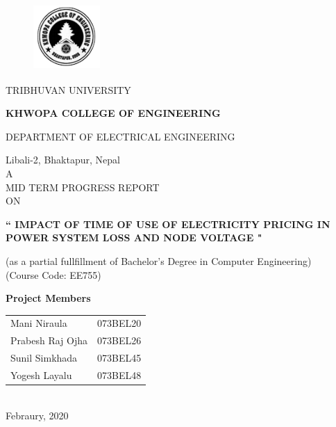\documentclass[12pt]{article}
\begin{document}
\begin{titlepage}
\begin{figure}[H]
\centering
\includegraphics[width=1in,height=1in]{KhwopaLogo.PNG}
\end{figure}

\begin{center}
TRIBHUVAN UNIVERSITY\\
\begin{Large}
\textbf{KHWOPA COLLEGE OF ENGINEERING\\}
\end{Large}
\begin{large}
DEPARTMENT OF ELECTRICAL ENGINEERING\\
\end{large}
\bigskip
Libali-2, Bhaktapur, Nepal\\
\vspace{2.54cm}
A\\
\smallskip
MID TERM PROGRESS REPORT\\
\smallskip
ON\\
\smallskip
\begin{Large}
\textbf{`` IMPACT OF TIME OF USE OF ELECTRICITY PRICING IN POWER SYSTEM LOSS AND NODE VOLTAGE "}\\
\end{Large}
\smallskip
(as a partial fullfillment of Bachelor's Degree in Computer Engineering)\\
\smallskip
(Course Code: EE755)\\
\vspace{1in}		
\begin{large}
\textbf{Project Members}\\
\end{large}
\bigskip
\begin{tabular}{ll}
\bigskip
Mani Niraula & 073BEL20\\
\bigskip
Prabesh Raj Ojha & 073BEL26\\
\bigskip
Sunil Simkhada & 073BEL45\\
\bigskip
Yogesh Layalu & 073BEL48\\
\end{tabular}\\
\vspace{1in}
Febraury, 2020
\end{center}
\end{titlepage}
\end{document}
